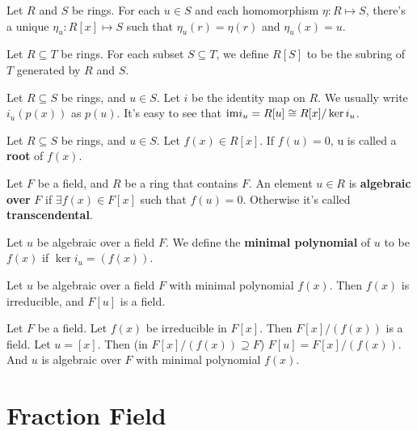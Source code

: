 \documentclass[12pt]{book}
\begin{document}
\begin{lemma}
	Let $R$ and $S$ be rings. For each $u\in S$ and each homomorphism $\eta:R\mapsto S$, there's a unique $\eta_u:R[x]\mapsto S$ such that $\eta_u(r)=\eta(r)$ and $\eta_u(x)=u$.
\end{lemma}

\begin{definition}
	Let $R\subseteq T$ be rings. For each subset $S\subseteq T$, we define $R[S]$ to be the subring of $T$ generated by $R$ and $S$. 
\end{definition}

\begin{lemma}
	Let $R\subseteq S$ be rings, and $u\in S$. Let $i$ be the identity map on $R$. We usually write $i_u(p(x))$ as $p(u)$. It's easy to see that ${\rm im}i_u=R[u]\cong R[x]/\ker i_u$.
\end{lemma}

\begin{definition}
	Let $R\subseteq S$ be rings, and $u\in S$. Let $f(x)\in R[x]$. If $f(u)=0$, u is called a {\bf root} of $f(x)$.
\end{definition}

\begin{definition}
	Let $F$ be a field, and $R$ be a ring that contains $F$. An element $u\in R$ is {\bf algebraic over} $F$ if $\exists f(x)\in F[x]$ such that $f(u)=0$. Otherwise it's called {\bf transcendental}.
\end{definition}

\begin{definition}
	Let $u$ be algebraic over a field $F$. We define the {\bf minimal polynomial} of $u$ to be $f(x)$ if $\ker i_u=(f(x))$.
\end{definition}

\begin{lemma}
	Let $u$ be algebraic over a field $F$ with minimal polynomial $f(x)$. Then $f(x)$ is irreducible, and  $F[u]$ is a field.
\end{lemma}


\begin{lemma}
	Let $F$ be a field. Let $f(x)$ be irreducible in $F[x]$. Then $F[x]/(f(x))$ is a field. Let $u=[x]$. Then (in $F[x]/(f(x))\supseteq F$) $F[u]=F[x]/(f(x))$. And $u$ is algebraic over $F$ with minimal polynomial $f(x)$. 
\end{lemma}

\section{Fraction Field}
\end{document}
